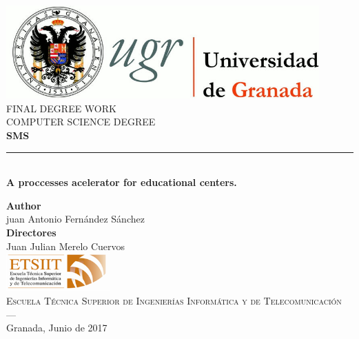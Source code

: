 \begin{titlepage}


\newlength{\centeroffset}
\setlength{\centeroffset}{-0.5\oddsidemargin}
\addtolength{\centeroffset}{0.5\evensidemargin}
\thispagestyle{empty}

\noindent\hspace*{\centeroffset}\begin{minipage}{\textwidth}

\centering
\includegraphics[width=0.9\textwidth]{img/logo_ugr.jpg}\\[1.4cm]

\textsc{ \Large FINAL DEGREE WORK \\[0.2cm]}
\textsc{ COMPUTER SCIENCE DEGREE }\\[1cm]
%
{\Huge\bfseries SMS\\
}
\noindent\rule[-1ex]{\textwidth}{3pt}\\[3.5ex]
{\large\bfseries A proccesses acelerator for educational centers.}
\end{minipage}

\vspace{2.5cm}
\noindent\hspace*{\centeroffset}\begin{minipage}{\textwidth}
\centering

\textbf{Author}\\ {juan Antonio Fernández Sánchez}\\[2.5ex]
\textbf{Directores}\\
{Juan Julian Merelo Cuervos}\\[2cm]
\includegraphics[width=0.3\textwidth]{img/etsiit_logo.png}\\[0.1cm]
\textsc{Escuela Técnica Superior de Ingenierías Informática y de Telecomunicación}\\
\textsc{---}\\
Granada, Junio de 2017
\end{minipage}
\end{titlepage}
